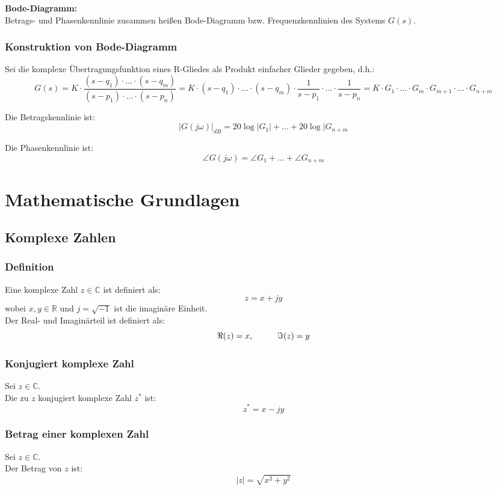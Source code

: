 \documentclass[10pt,a4paper]{article}
\newcommand{\tab}[1][1]{\hspace*{#1cm}}
\begin{document}
\textbf{Bode-Diagramm:} \\
Betrags- und Phasenkennlinie zusammen heißen Bode-Diagramm bzw. Frequenzkennlinien des Systems $G(s)$.

\subsubsection{Konstruktion von Bode-Diagramm}
Sei die komplexe Übertragungsfunktion eines R-Gliedes als Produkt einfacher Glieder gegeben, d.h.:
$$
	G(s) = K ⋅ \frac{(s-q_1) ⋅ \dots ⋅ (s - q_m)}{(s - p_1) ⋅ \dots ⋅ (s - p_n)} = K ⋅ (s - q_1) ⋅ \dots ⋅ (s - q_m) ⋅ \frac{1}{s - p_1} ⋅ \dots ⋅ \frac{1}{s - p_n} = K ⋅ G_1 ⋅ \dots ⋅ G_m ⋅ G_{m+1} ⋅ \dots ⋅ G_{n + m}
$$

Die Betragskennlinie ist:
$$
	|G(j \omega)|_{dB} = 20 \log |G_1| + \dots + 20 \log |G_{n + m}
$$

Die Phasenkennlinie ist:
$$
	\angle G(j \omega) = \angle G_1 + \dots + \angle G_{n + m}
$$




\pagebreak
\section{Mathematische Grundlagen}
\subsection{Komplexe Zahlen}
\subsubsection{Definition}
Eine komplexe Zahl $z \in \mathbb{C}$ ist definiert als:
$$
	z = x + jy
$$
wobei $x, y \in \mathbb{R}$ und
$j = \sqrt{-1}$ ist die imaginäre Einheit. \\

Der Real- und Imaginärteil ist definiert als:
$$
	\Re(z) = x, \tab 	\Im(z) = y
$$

\subsubsection{Konjugiert komplexe Zahl}
Sei $z \in \mathbb{C}$. \\
Die zu $z$ konjugiert komplexe Zahl $z^*$ ist:
$$
	z^* = x - jy
$$

\subsubsection{Betrag einer komplexen Zahl}
Sei $z \in \mathbb{C}$. \\
Der Betrag von $z$ ist:
$$
	|z| = \sqrt{x^2 + y^2}
$$
\end{document}
